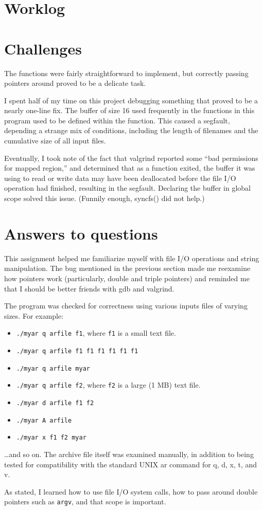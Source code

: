 \documentclass[12pt,letterpaper]{article}
\begin{document}
\section*{Worklog}


\section*{Challenges}

The functions were fairly straightforward to implement, but correctly passing
pointers around proved to be a delicate task.

I spent half of my time on this project debugging something that proved to be
a nearly one-line fix. The buffer of size 16 used frequently in the functions
in this program used to be defined within the function. This caused a segfault,
depending a strange mix of conditions, including the length of filenames and
the cumulative size of all input files.

Eventually, I took note of the fact that valgrind reported some ``bad
permissions for mapped region,'' and determined that as a function exited, the
buffer it was using to read or write data may have been deallocated before the
file I/O operation had finished, resulting in the segfault. Declaring the
buffer in global scope solved this issue. (Funnily enough, syncfs() did not
help.)


\section*{Answers to questions}

This assignment helped me familiarize myself with file I/O operations and
string manipulation. The bug mentioned in the previous section made me
reexamine how pointers work (particularly, double and triple pointers) and
reminded me that I should be better friends with gdb and valgrind.

The program was checked for correctness using various inputs files of varying
sizes. For example:

\begin{itemize}
	\item {\tt ./myar q arfile f1}, where {\tt f1} is a small text file.
	\item {\tt ./myar q arfile f1 f1 f1 f1 f1 f1}
	\item {\tt ./myar q arfile myar}
	\item {\tt ./myar q arfile f2}, where {\tt f2} is a large (1 MB) text file.
	\item {\tt ./myar d arfile f1 f2}
	\item {\tt ./myar A arfile}
	\item {\tt ./myar x f1 f2 myar}
\end{itemize}

\dots and so on. The archive file itself was examined manually, in addition to
being tested for compatibility with the standard UNIX ar command for q, d, x,
t, and v.

As stated, I learned how to use file I/O system calls, how to pass around double pointers such as {\tt argv}, and that scope is important.
\end{document}
